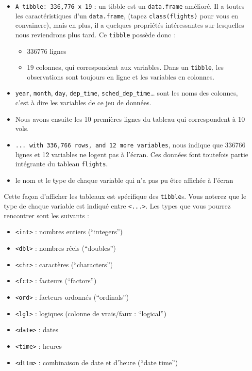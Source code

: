 \documentclass[
  a4paper,
]{article}
\providecommand{\tightlist}{%
  \setlength{\itemsep}{0pt}\setlength{\parskip}{0pt}}
\begin{document}
\begin{itemize}
\tightlist
\item
  \texttt{A\ tibble:\ 336,776\ x\ 19} : un tibble est un \texttt{data.frame} amélioré. Il a toutes les caractéristiques d'un \texttt{data.frame}, (tapez \texttt{class(flights)} pour vous en convaincre), mais en plus, il a quelques propriétés intéressantes sur lesquelles nous reviendrons plus tard. Ce \texttt{tibble} possède donc :

  \begin{itemize}
  \tightlist
  \item
    336776 lignes
  \item
    19 colonnes, qui correspondent aux variables. Dans un \texttt{tibble}, les observations sont toujours en ligne et les variables en colonnes.
  \end{itemize}
\item
  \texttt{year}, \texttt{month}, \texttt{day}, \texttt{dep\_time}, \texttt{sched\_dep\_time}\ldots{} sont les noms des colonnes, c'est à dire les variables de ce jeu de données.
\item
  Nous avons ensuite les 10 premières lignes du tableau qui correspondent à 10 vols.
\item
  \texttt{...\ with\ 336,766\ rows,\ and\ 12\ more\ variables}, nous indique que 336766 lignes et 12 variables ne logent pas à l'écran. Ces données font toutefois partie intégrante du tableau \texttt{flights}.
\item
  le nom et le type de chaque variable qui n'a pas pu être affichée à l'écran
\end{itemize}

Cette façon d'afficher les tableaux est spécifique des \texttt{tibble}s. Vous noterez que le type de chaque variable est indiqué entre \texttt{\textless{}...\textgreater{}}. Les types que vous pourrez rencontrer sont les suivants :

\begin{itemize}
\tightlist
\item
  \texttt{\textless{}int\textgreater{}} : nombres entiers (``integers'')
\item
  \texttt{\textless{}dbl\textgreater{}} : nombres réels (``doubles'')
\item
  \texttt{\textless{}chr\textgreater{}} : caractères (``characters'')
\item
  \texttt{\textless{}fct\textgreater{}} : facteurs (``factors'')
\item
  \texttt{\textless{}ord\textgreater{}} : facteurs ordonnés (``ordinals'')
\item
  \texttt{\textless{}lgl\textgreater{}} : logiques (colonne de vrais/faux : ``logical'')
\item
  \texttt{\textless{}date\textgreater{}} : dates
\item
  \texttt{\textless{}time\textgreater{}} : heures
\item
  \texttt{\textless{}dttm\textgreater{}} : combinaison de date et d'heure (``date time'')
\end{itemize}
\end{document}
